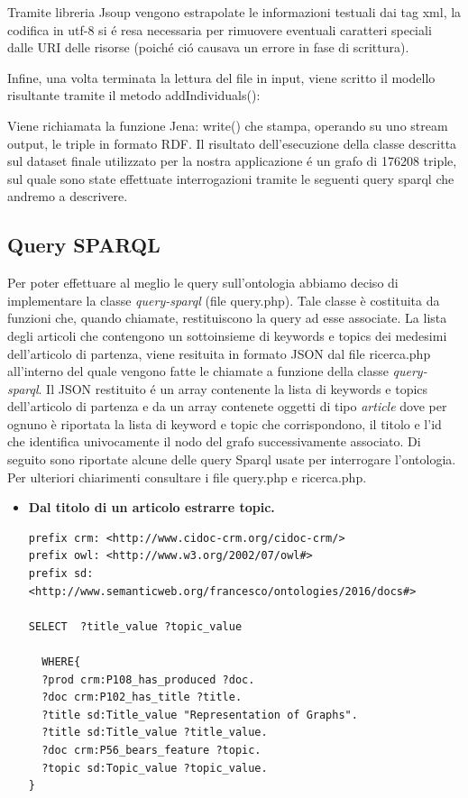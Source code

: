\documentclass[11pt,a4paper]{article}
\begin{document}

Tramite libreria Jsoup vengono estrapolate le informazioni testuali dai tag xml, la codifica in utf-8 si \'e resa necessaria per rimuovere eventuali caratteri speciali dalle URI delle risorse (poich\'e ci\'o causava un errore in fase di scrittura).

Infine, una volta terminata la lettura del file in input, viene scritto il modello risultante tramite il metodo addIndividuals():



Viene richiamata la funzione Jena: write() che stampa, operando su uno stream output, le triple in formato RDF.
Il risultato dell'esecuzione della classe descritta sul dataset finale utilizzato per la nostra applicazione \'e un grafo di 176208 triple, sul quale sono state effettuate interrogazioni tramite le seguenti query sparql che andremo a descrivere.

\subsection{Query SPARQL}

Per poter effettuare al meglio le query sull'ontologia abbiamo deciso di implementare la classe \textit{query-sparql} (file query.php). Tale classe è costituita da funzioni che, quando chiamate, restituiscono la query ad esse associate.
\newline \newline
La lista degli articoli che contengono un sottoinsieme di keywords e topics dei medesimi dell'articolo di partenza, viene resituita in formato JSON dal file ricerca.php all'interno del quale vengono fatte le chiamate a funzione della classe \textit{query-sparql}. Il JSON restituito \'e un array contenente la lista di keywords e topics dell'articolo di partenza e da un array contenete oggetti di tipo \textit{article} dove per ognuno è riportata la lista di keyword e topic che corrispondono, il titolo e l'id che identifica univocamente il nodo del grafo successivamente associato.
Di seguito sono riportate alcune delle query  Sparql usate per interrogare l'ontologia. Per ulteriori chiarimenti consultare i file query.php e ricerca.php.

\begin{itemize}
\item \textbf{Dal titolo di un articolo estrarre topic.}
\begin{lstlisting}[breaklines=true]
prefix crm: <http://www.cidoc-crm.org/cidoc-crm/>
prefix owl: <http://www.w3.org/2002/07/owl#>
prefix sd: <http://www.semanticweb.org/francesco/ontologies/2016/docs#>

SELECT  ?title_value ?topic_value
 
  WHERE{
  ?prod crm:P108_has_produced ?doc.
  ?doc crm:P102_has_title ?title.
  ?title sd:Title_value "Representation of Graphs".
  ?title sd:Title_value ?title_value.
  ?doc crm:P56_bears_feature ?topic.
  ?topic sd:Topic_value ?topic_value.
}
\end{lstlisting}
\end{itemize}
\end{document}
